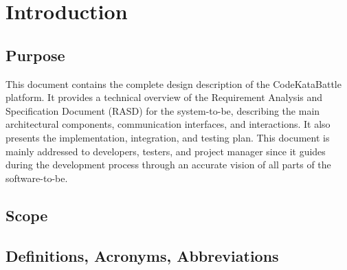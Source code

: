 \chapter{Introduction}

\section{Purpose}
This document contains the complete design description of the CodeKataBattle platform. 
It provides a technical overview of the Requirement Analysis and Specification Document (RASD) for the system-to-be, describing the main architectural components, communication interfaces, and interactions. 
It also presents the implementation, integration, and testing plan. 
This document is mainly addressed to developers, testers, and project manager since it guides during the development process through an accurate vision of all parts of the software-to-be. 

\section{Scope}

\section{Definitions, Acronyms, Abbreviations}
